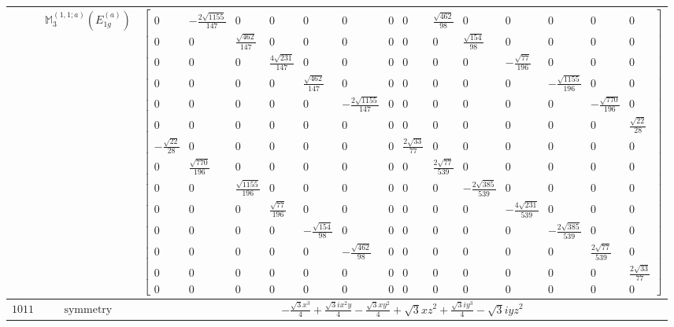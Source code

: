 \documentclass[fleqn,8pt,landscape]{jsarticle}
\begin{document}
\begin{longtable}{ccc}
$  $ & $ \mathbb{M}_{3}^{(1,1;a)}(E_{1g}^{(a)}) $ & $ \begin{bmatrix} 0 & - \frac{2 \sqrt{1155}}{147} & 0 & 0 & 0 & 0 & 0 & 0 & \frac{\sqrt{462}}{98} & 0 & 0 & 0 & 0 & 0 \\ 0 & 0 & \frac{\sqrt{462}}{147} & 0 & 0 & 0 & 0 & 0 & 0 & \frac{\sqrt{154}}{98} & 0 & 0 & 0 & 0 \\ 0 & 0 & 0 & \frac{4 \sqrt{231}}{147} & 0 & 0 & 0 & 0 & 0 & 0 & - \frac{\sqrt{77}}{196} & 0 & 0 & 0 \\ 0 & 0 & 0 & 0 & \frac{\sqrt{462}}{147} & 0 & 0 & 0 & 0 & 0 & 0 & - \frac{\sqrt{1155}}{196} & 0 & 0 \\ 0 & 0 & 0 & 0 & 0 & - \frac{2 \sqrt{1155}}{147} & 0 & 0 & 0 & 0 & 0 & 0 & - \frac{\sqrt{770}}{196} & 0 \\ 0 & 0 & 0 & 0 & 0 & 0 & 0 & 0 & 0 & 0 & 0 & 0 & 0 & \frac{\sqrt{22}}{28} \\ - \frac{\sqrt{22}}{28} & 0 & 0 & 0 & 0 & 0 & 0 & \frac{2 \sqrt{33}}{77} & 0 & 0 & 0 & 0 & 0 & 0 \\ 0 & \frac{\sqrt{770}}{196} & 0 & 0 & 0 & 0 & 0 & 0 & \frac{2 \sqrt{77}}{539} & 0 & 0 & 0 & 0 & 0 \\ 0 & 0 & \frac{\sqrt{1155}}{196} & 0 & 0 & 0 & 0 & 0 & 0 & - \frac{2 \sqrt{385}}{539} & 0 & 0 & 0 & 0 \\ 0 & 0 & 0 & \frac{\sqrt{77}}{196} & 0 & 0 & 0 & 0 & 0 & 0 & - \frac{4 \sqrt{231}}{539} & 0 & 0 & 0 \\ 0 & 0 & 0 & 0 & - \frac{\sqrt{154}}{98} & 0 & 0 & 0 & 0 & 0 & 0 & - \frac{2 \sqrt{385}}{539} & 0 & 0 \\ 0 & 0 & 0 & 0 & 0 & - \frac{\sqrt{462}}{98} & 0 & 0 & 0 & 0 & 0 & 0 & \frac{2 \sqrt{77}}{539} & 0 \\ 0 & 0 & 0 & 0 & 0 & 0 & 0 & 0 & 0 & 0 & 0 & 0 & 0 & \frac{2 \sqrt{33}}{77} \\ 0 & 0 & 0 & 0 & 0 & 0 & 0 & 0 & 0 & 0 & 0 & 0 & 0 & 0 \end{bmatrix} $ \\ \hline
$ 1011 $ & $ \text{symmetry} $ & $ - \frac{\sqrt{3} x^{3}}{4} + \frac{\sqrt{3} i x^{2} y}{4} - \frac{\sqrt{3} x y^{2}}{4} + \sqrt{3} x z^{2} + \frac{\sqrt{3} i y^{3}}{4} - \sqrt{3} i y z^{2} $ \\

\end{longtable}
\end{document}
